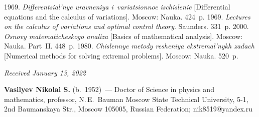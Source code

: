 





  \begin{multicols}{2}

\renewcommand{\bibname}{\protect\rmfamily References}

{\small\frenchspacing
 {%
 \begin{thebibliography}{9}
 1969. \textit{Differentsial'nye uravneniya i~va\-ri\-a\-tsi\-on\-noe ischislenie} 
[Differential equations and the calculus of variations]. Moscow: Nauka. 424~p.
 1969. \textit{Lectures on the calculus of variations and optimal control theory}. Saunders. 331~p.
 2000. \textit{Osnovy ma\-te\-ma\-ti\-che\-sko\-go analiza} [Basics 
of mathematical analysis]. Moscow: Nauka.   Part~II. 448~p.
 1980. \textit{Chislennye metody resheniya eks\-tre\-mal'\-nykh zadach} [Numerical 
methods for solving extremal problems]. Moscow: Nauka. 520~p.
\end{thebibliography}

 }
 }

\end{multicols}

\vspace*{-6pt}

\hfill{\small\textit{Received January 13, 2022}}

\Contrl

\noindent
\textbf{Vasilyev Nikolai S.} (b.\ 1952)~--- Doctor of Science in physics and mathematics, professor, 
N.\,E.~Bauman Moscow State Technical University, 5-1, 2nd Baumanskaya Str., Moscow 105005, 
Russian Federation; \mbox{nik8519@yandex.ru}

  

\label{end\stat}

\renewcommand{\bibname}{\protect\rm Литература}    